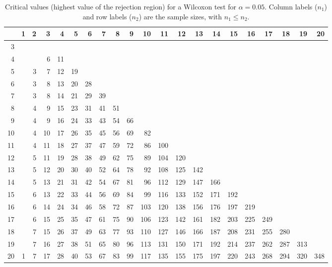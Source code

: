 \begin{table}[ht]
\centering
\begin{tabular}{rrrrrrrrrrrrrrrrrrrrr}
  \hline
 & 1 & 2 & 3 & 4 & 5 & 6 & 7 & 8 & 9 & 10 & 11 & 12 & 13 & 14 & 15 & 16 & 17 & 18 & 19 & 20 \\ 
  \hline
  3 &  &  &  &  &  &  &  &  &  &  &  &  &  &  &  &  &  &  &  &  \\ 
  4 &  &  & 6 & 11 &  &  &  &  &  &  &  &  &  &  &  &  &  &  &  &  \\ 
  5 &  & 3 & 7 & 12 & 19 &  &  &  &  &  &  &  &  &  &  &  &  &  &  &  \\ 
  6 &  & 3 & 8 & 13 & 20 & 28 &  &  &  &  &  &  &  &  &  &  &  &  &  &  \\ 
  7 &  & 3 & 8 & 14 & 21 & 29 & 39 &  &  &  &  &  &  &  &  &  &  &  &  &  \\ 
  8 &  & 4 & 9 & 15 & 23 & 31 & 41 & 51 &  &  &  &  &  &  &  &  &  &  &  &  \\ 
  9 &  & 4 & 9 & 16 & 24 & 33 & 43 & 54 & 66 &  &  &  &  &  &  &  &  &  &  &  \\ 
  10 &  & 4 & 10 & 17 & 26 & 35 & 45 & 56 & 69 & 82 &  &  &  &  &  &  &  &  &  &  \\ 
  11 &  & 4 & 11 & 18 & 27 & 37 & 47 & 59 & 72 & 86 & 100 &  &  &  &  &  &  &  &  &  \\ 
  12 &  & 5 & 11 & 19 & 28 & 38 & 49 & 62 & 75 & 89 & 104 & 120 &  &  &  &  &  &  &  &  \\ 
  13 &  & 5 & 12 & 20 & 30 & 40 & 52 & 64 & 78 & 92 & 108 & 125 & 142 &  &  &  &  &  &  &  \\ 
  14 &  & 5 & 13 & 21 & 31 & 42 & 54 & 67 & 81 & 96 & 112 & 129 & 147 & 166 &  &  &  &  &  &  \\ 
  15 &  & 6 & 13 & 22 & 33 & 44 & 56 & 69 & 84 & 99 & 116 & 133 & 152 & 171 & 192 &  &  &  &  &  \\ 
  16 &  & 6 & 14 & 24 & 34 & 46 & 58 & 72 & 87 & 103 & 120 & 138 & 156 & 176 & 197 & 219 &  &  &  &  \\ 
  17 &  & 6 & 15 & 25 & 35 & 47 & 61 & 75 & 90 & 106 & 123 & 142 & 161 & 182 & 203 & 225 & 249 &  &  &  \\ 
  18 &  & 7 & 15 & 26 & 37 & 49 & 63 & 77 & 93 & 110 & 127 & 146 & 166 & 187 & 208 & 231 & 255 & 280 &  &  \\ 
  19 &  & 7 & 16 & 27 & 38 & 51 & 65 & 80 & 96 & 113 & 131 & 150 & 171 & 192 & 214 & 237 & 262 & 287 & 313 &  \\ 
  20 & 1 & 7 & 17 & 28 & 40 & 53 & 67 & 83 & 99 & 117 & 135 & 155 & 175 & 197 & 220 & 243 & 268 & 294 & 320 & 348 \\ 
   \hline
\end{tabular}
\caption{Critical values (highest value of the rejection region) for a Wilcoxon test for $\alpha=0.05$. Column labels ($n_1$) and row labels ($n_2$) are the sample sizes, with ${n_1}\leq{n_2}$.} 
\end{table}
